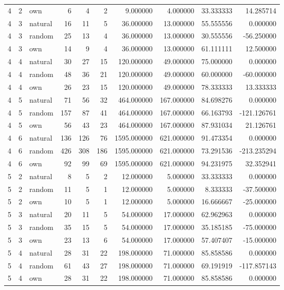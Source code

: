 \begin{table}[htbp]
\begin{tabular}{rrlrrrrrrr}
4 & 2 & own & 6 & 4 & 2 & 9.000000 & 4.000000 & 33.333333 & 14.285714 \\
4 & 3 & natural & 16 & 11 & 5 & 36.000000 & 13.000000 & 55.555556 & 0.000000 \\
4 & 3 & random & 25 & 13 & 4 & 36.000000 & 13.000000 & 30.555556 & -56.250000 \\
4 & 3 & own & 14 & 9 & 4 & 36.000000 & 13.000000 & 61.111111 & 12.500000 \\
4 & 4 & natural & 30 & 27 & 15 & 120.000000 & 49.000000 & 75.000000 & 0.000000 \\
4 & 4 & random & 48 & 36 & 21 & 120.000000 & 49.000000 & 60.000000 & -60.000000 \\
4 & 4 & own & 26 & 23 & 15 & 120.000000 & 49.000000 & 78.333333 & 13.333333 \\
4 & 5 & natural & 71 & 56 & 32 & 464.000000 & 167.000000 & 84.698276 & 0.000000 \\
4 & 5 & random & 157 & 87 & 41 & 464.000000 & 167.000000 & 66.163793 & -121.126761 \\
4 & 5 & own & 56 & 43 & 23 & 464.000000 & 167.000000 & 87.931034 & 21.126761 \\
4 & 6 & natural & 136 & 126 & 76 & 1595.000000 & 621.000000 & 91.473354 & 0.000000 \\
4 & 6 & random & 426 & 308 & 186 & 1595.000000 & 621.000000 & 73.291536 & -213.235294 \\
4 & 6 & own & 92 & 99 & 69 & 1595.000000 & 621.000000 & 94.231975 & 32.352941 \\
5 & 2 & natural & 8 & 5 & 2 & 12.000000 & 5.000000 & 33.333333 & 0.000000 \\
5 & 2 & random & 11 & 5 & 1 & 12.000000 & 5.000000 & 8.333333 & -37.500000 \\
5 & 2 & own & 10 & 5 & 1 & 12.000000 & 5.000000 & 16.666667 & -25.000000 \\
5 & 3 & natural & 20 & 11 & 5 & 54.000000 & 17.000000 & 62.962963 & 0.000000 \\
5 & 3 & random & 35 & 15 & 5 & 54.000000 & 17.000000 & 35.185185 & -75.000000 \\
5 & 3 & own & 23 & 13 & 6 & 54.000000 & 17.000000 & 57.407407 & -15.000000 \\
5 & 4 & natural & 28 & 31 & 22 & 198.000000 & 71.000000 & 85.858586 & 0.000000 \\
5 & 4 & random & 61 & 43 & 27 & 198.000000 & 71.000000 & 69.191919 & -117.857143 \\
5 & 4 & own & 28 & 31 & 22 & 198.000000 & 71.000000 & 85.858586 & 0.000000 \\

\end{tabular}
\end{table}
